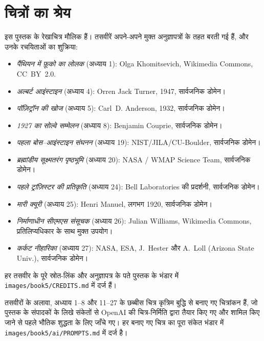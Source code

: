 \chapter*{चित्रों का श्रेय}

इस पुस्तक के रेखाचित्र मौलिक हैं। तसवीरें अपने-अपने मुक्त अनुज्ञापत्रों
के तहत बरती गई हैं, और उनके रचयिताओं का शुक्रिया:

\begin{itemize}
  \item \emph{पैंथियन में फ़ूको का लोलक} (अध्याय 1): Olga
        Khomitsevich, Wikimedia Commons, CC~BY~2.0.
  \item \emph{अल्बर्ट आइंस्टाइन} (अध्याय 4): Orren Jack Turner,
        1947, सार्वजनिक डोमेन।
  \item \emph{पॉज़िट्रॉन की खोज} (अध्याय 5): Carl~D. Anderson,
        1932, सार्वजनिक डोमेन।
  \item \emph{1927 का सोल्वे सम्मेलन} (अध्याय 8): Benjamin Couprie,
        सार्वजनिक डोमेन।
  \item \emph{पहला बोस--आइंस्टाइन संघनन} (अध्याय 19):
        NIST/JILA/CU-Boulder, सार्वजनिक डोमेन।
  \item \emph{ब्रह्मांडीय सूक्ष्मतरंग पृष्ठभूमि} (अध्याय 20):
        NASA / WMAP Science Team, सार्वजनिक डोमेन।
  \item \emph{पहले ट्रांज़िस्टर की प्रतिकृति} (अध्याय 24): Bell
        Laboratories की प्रदर्शनी, सार्वजनिक डोमेन।
  \item \emph{मारी क्यूरी} (अध्याय 25): Henri Manuel, लगभग 1920,
        सार्वजनिक डोमेन।
  \item \emph{निर्माणाधीन सीएमएस संसूचक} (अध्याय 26): Julian
        Williams, Wikimedia Commons, प्रतिलिप्यधिकार के साथ मुक्त
        उपयोग।
  \item \emph{कर्कट नीहारिका} (अध्याय 27): NASA, ESA, J.~Hester और
        A.~Loll (Arizona State Univ.), सार्वजनिक डोमेन।
\end{itemize}

हर तसवीर के पूरे स्रोत-लिंक और अनुज्ञापत्र के पते पुस्तक के भंडार में
\texttt{images/book5/CREDITS.md} में दर्ज हैं।

\bigskip
तसवीरों के अलावा, अध्याय 1--8 और 11--27 के छब्बीस चित्र कृत्रिम बुद्धि
से बनाए गए चित्रांकन हैं, जो पुस्तक के संपादकों के लिखे संकेतों से
OpenAI की चित्र-निर्मिति द्वारा तैयार किए गए और शामिल किए जाने से पहले
भौतिक शुद्धता के लिए जाँचे गए। हर बनाए गए चित्र का पूरा संकेत भंडार में
\texttt{images/book5/ai/PROMPTS.md} में दर्ज है।
\clearpage
